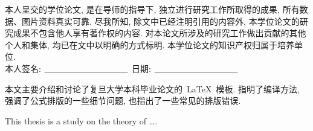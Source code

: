 {%

本人呈交的学位论文, 是在导师的指导下, 独立进行研究工作所取得的成果,
所有数据、图片资料真实可靠. 尽我所知, 除文中已经注明引用的内容外,
本学位论文的研究成果不包含他人享有著作权的内容.
对本论文所涉及的研究工作做出贡献的其他个人和集体,
均已在文中以明确的方式标明. 本学位论文的知识产权归属于培养单位.\\[2cm]

\hspace*{1cm}本人签名: $\underline{\hspace{3.5cm}}$
\hspace{2cm}日期: $\underline{\hspace{3.5cm}}$\hfill\par}
\baselineskip=23pt  %





\begin{cnabstract}
本文主要介绍和讨论了复旦大学本科毕业论文的~\LaTeX~模板.
指明了编译方法, 强调了公式排版的一些细节问题, 也指出了一些常见的排版错误.



\end{cnabstract}
\par
\vspace*{2em}






\begin{enabstract}
This thesis is a study on the theory of \dots.

\end{enabstract}
\par
\vspace*{2em}

 \enkeywords{\LaTeX{};  }
